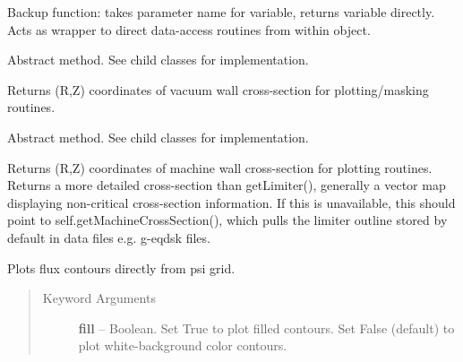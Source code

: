 \documentclass[letterpaper,10pt,english]{sphinxmanual}
\begin{document}
\begin{fulllineitems}
\begin{fulllineitems}
Backup function: takes parameter name for variable, returns variable directly.
Acts as wrapper to direct data-access routines from within object.

\end{fulllineitems}


\begin{fulllineitems}
\label{eqtools:eqtools.core.Equilibrium.getMachineCrossSection}
Abstract method.  See child classes for implementation.

Returns (R,Z) coordinates of vacuum wall cross-section for plotting/masking routines.

\end{fulllineitems}


\begin{fulllineitems}
\label{eqtools:eqtools.core.Equilibrium.getMachineCrossSectionFull}
Abstract method.  See child classes for implementation.

Returns (R,Z) coordinates of machine wall cross-section for plotting routines.
Returns a more detailed cross-section than getLimiter(), generally a vector map
displaying non-critical cross-section information.  If this is unavailable, this
should point to self.getMachineCrossSection(), which pulls the limiter outline
stored by default in data files e.g. g-eqdsk files.

\end{fulllineitems}


\begin{fulllineitems}
\label{eqtools:eqtools.core.Equilibrium.plotFlux}
Plots flux contours directly from psi grid.
\begin{quote}\begin{description}
\item[{Keyword Arguments}] \leavevmode
\textbf{fill} --
Boolean.
Set True to plot filled contours.  Set False (default) to plot white-background
color contours.

\end{description}\end{quote}

\end{fulllineitems}


\end{fulllineitems}
\end{document}
